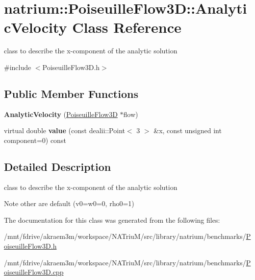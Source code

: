 \hypertarget{classnatrium_1_1PoiseuilleFlow3D_1_1AnalyticVelocity}{
\section{natrium::PoiseuilleFlow3D::AnalyticVelocity Class Reference}
\label{classnatrium_1_1PoiseuilleFlow3D_1_1AnalyticVelocity}
}


class to describe the x-\/component of the analytic solution  


{\ttfamily \#include $<$PoiseuilleFlow3D.h$>$}\subsection*{Public Member Functions}
\begin{DoxyCompactItemize}
\item 
\hypertarget{classnatrium_1_1PoiseuilleFlow3D_1_1AnalyticVelocity_ab56ec080a642f5cc3b5b5857bcd915b4}{
{\bfseries AnalyticVelocity} (\hyperlink{classnatrium_1_1PoiseuilleFlow3D}{PoiseuilleFlow3D} $\ast$flow)}
\label{classnatrium_1_1PoiseuilleFlow3D_1_1AnalyticVelocity_ab56ec080a642f5cc3b5b5857bcd915b4}

\item 
\hypertarget{classnatrium_1_1PoiseuilleFlow3D_1_1AnalyticVelocity_ad30167ebbaf4d7f1cec7bf548f3e0dc5}{
virtual double {\bfseries value} (const dealii::Point$<$ 3 $>$ \&x, const unsigned int component=0) const }
\label{classnatrium_1_1PoiseuilleFlow3D_1_1AnalyticVelocity_ad30167ebbaf4d7f1cec7bf548f3e0dc5}

\end{DoxyCompactItemize}


\subsection{Detailed Description}
class to describe the x-\/component of the analytic solution \begin{DoxyNote}{Note}
other are default (v0=w0=0, rho0=1) 
\end{DoxyNote}


The documentation for this class was generated from the following files:\begin{DoxyCompactItemize}
\item 
/mnt/fdrive/akraem3m/workspace/NATriuM/src/library/natrium/benchmarks/\hyperlink{PoiseuilleFlow3D_8h}{PoiseuilleFlow3D.h}\item 
/mnt/fdrive/akraem3m/workspace/NATriuM/src/library/natrium/benchmarks/\hyperlink{PoiseuilleFlow3D_8cpp}{PoiseuilleFlow3D.cpp}\end{DoxyCompactItemize}
